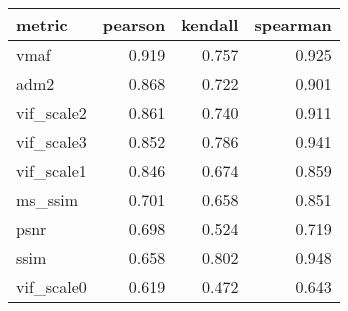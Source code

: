 \begin{tabular}{lrrr}
\toprule
    metric &  pearson &  kendall &  spearman \\
\midrule
      vmaf &    0.919 &    0.757 &     0.925 \\
      adm2 &    0.868 &    0.722 &     0.901 \\
vif\_scale2 &    0.861 &    0.740 &     0.911 \\
vif\_scale3 &    0.852 &    0.786 &     0.941 \\
vif\_scale1 &    0.846 &    0.674 &     0.859 \\
   ms\_ssim &    0.701 &    0.658 &     0.851 \\
      psnr &    0.698 &    0.524 &     0.719 \\
      ssim &    0.658 &    0.802 &     0.948 \\
vif\_scale0 &    0.619 &    0.472 &     0.643 \\
\bottomrule
\end{tabular}
